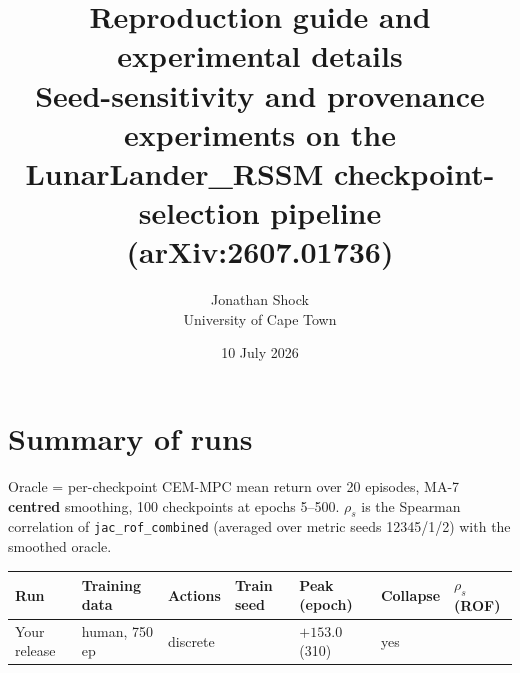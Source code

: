 \documentclass[11pt]{article}
\title{\textbf{Reproduction guide and experimental details}\\[0.4em]\large Seed-sensitivity and provenance experiments on the LunarLander\_RSSM checkpoint-selection pipeline (arXiv:2607.01736)}
\author{Jonathan Shock\\University of Cape Town}
\date{10 July 2026}
\begin{document}
\maketitle


\section{Summary of runs}\label{summary-of-runs}

Oracle = per-checkpoint CEM-MPC mean return over 20 episodes, MA-7
\textbf{centred} smoothing, 100 checkpoints at epochs 5--500. \(\rho_s\)
is the Spearman correlation of \texttt{jac\_rof\_combined} (averaged
over metric seeds 12345/1/2) with the smoothed oracle.

\begin{longtable}[]{@{}
  >{\raggedright\arraybackslash}p{}
  >{\raggedright\arraybackslash}p{}
  >{\raggedright\arraybackslash}p{}
  >{\raggedright\arraybackslash}p{}
  >{\raggedright\arraybackslash}p{}
  >{\raggedright\arraybackslash}p{}
  >{\raggedright\arraybackslash}p{}@{}}
\toprule\noalign{}
\begin{minipage}[b]{\linewidth}\raggedright
Run
\end{minipage} & \begin{minipage}[b]{\linewidth}\raggedright
Training data
\end{minipage} & \begin{minipage}[b]{\linewidth}\raggedright
Actions
\end{minipage} & \begin{minipage}[b]{\linewidth}\raggedright
Train seed
\end{minipage} & \begin{minipage}[b]{\linewidth}\raggedright
Peak (epoch)
\end{minipage} & \begin{minipage}[b]{\linewidth}\raggedright
Collapse
\end{minipage} & \begin{minipage}[b]{\linewidth}\raggedright
\(\rho_s\)(ROF)
\end{minipage} \\
\midrule\noalign{}
\endhead
\bottomrule\noalign{}
\endlastfoot
Your release & human, 750 ep & discrete & 12345 & \(+153.0\) (310) & yes

\end{longtable}
\end{document}
